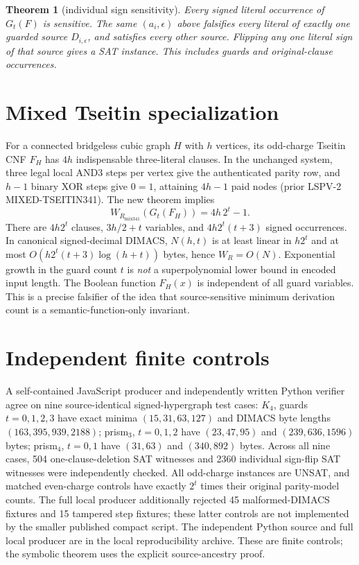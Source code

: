 \documentclass[11pt]{article}
\newtheorem{theorem}{Theorem}
\begin{document}
\begin{theorem}[individual sign sensitivity]
Every signed literal occurrence of $G_t(F)$ is sensitive. The same $(a_i,\epsilon)$ above falsifies every literal of exactly one guarded source $D_{i,\epsilon}$, and satisfies every other source. Flipping any one literal sign of that source gives a SAT instance. This includes guards and original-clause occurrences.
\end{theorem}
\section*{Mixed Tseitin specialization}
For a connected bridgeless cubic graph $H$ with $h$ vertices, its odd-charge Tseitin CNF $F_H$ has $4h$ indispensable three-literal clauses. In the unchanged system, three legal local AND3 steps per vertex give the authenticated parity row, and $h-1$ binary XOR steps give $0=1$, attaining $4h-1$ paid nodes (prior LSPV-2 MIXED-TSEITIN341). The new theorem implies
\[
\boxed{W_{R_{\mathrm{mix341}}}(G_t(F_H))=4h\,2^t-1.}
\]
There are $4h2^t$ clauses, $3h/2+t$ variables, and $4h2^t(t+3)$ signed occurrences. In canonical signed-decimal DIMACS, $N(h,t)$ is at least linear in $h2^t$ and at most $O(h2^t(t+3)\log(h+t))$ bytes, hence $W_R=O(N)$. Exponential growth in the guard count $t$ is \emph{not} a superpolynomial lower bound in encoded input length. The Boolean function $F_H(x)$ is independent of all guard variables. This is a precise falsifier of the idea that source-sensitive minimum derivation count is a semantic-function-only invariant.
\section*{Independent finite controls}
A self-contained JavaScript producer and independently written Python verifier agree on nine source-identical signed-hypergraph test cases: $K_4$, guards $t=0,1,2,3$ have exact minima $(15,31,63,127)$ and DIMACS byte lengths $(163,395,939,2188)$; prism$_3$, $t=0,1,2$ have $(23,47,95)$ and $(239,636,1596)$ bytes; prism$_4$, $t=0,1$ have $(31,63)$ and $(340,892)$ bytes. Across all nine cases, 504 one-clause-deletion SAT witnesses and 2360 individual sign-flip SAT witnesses were independently checked. All odd-charge instances are UNSAT, and matched even-charge controls have exactly $2^t$ times their original parity-model counts. The full local producer additionally rejected 45 malformed-DIMACS fixtures and 15 tampered step fixtures; these latter controls are not implemented by the smaller published compact script. The independent Python source and full local producer are in the local reproducibility archive. These are finite controls; the symbolic theorem uses the explicit source-ancestry proof.
\end{document}
